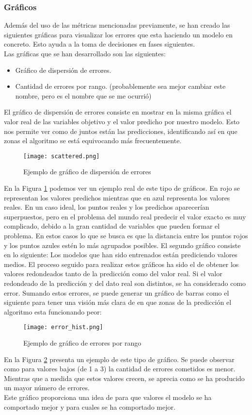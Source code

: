 \subsubsection*{Gráficos}
Además del uso de las métricas mencionadas previamente, se han creado las siguientes gráficas para visualizar los errores que esta haciendo un modelo en concreto. Esto ayuda a la toma de decisiones en fases siguientes.\\
Las gráficas que se han desarrollado son las siguientes:
\begin{itemize}
	\item Gráfico de dispersión de errores.
	\item Cantidad de errores por rango. (probablemente sea mejor cambiar este nombre, pero es el nombre que se me ocurrió)
\end{itemize}
El gráfico de dispersión de errores consiste en mostrar en la misma gráfica el valor real de las variables objetivo y el valor predicho por nuestro modelo. Esto nos permite ver como de juntos están las predicciones, identificando así en que zonas el algoritmo se está equivocando más frecuentemente.\\
\begin{figure}[H]
	\centering
	\texttt{[image: scattered.png]}
	\caption{Ejemplo de gráfico de dispersión de errores}
	\label{fig:scattered_example}
\end{figure}
En la Figura \ref{fig:scattered_example} podemos ver un ejemplo real de este tipo de gráficos. En rojo se representan los valores predichos mientras que en azul representa los valores reales. En un caso ideal, los puntos reales y los predichos aparecerían superpuestos, pero en el problema del mundo real predecir el valor exacto es muy complicado, debido a la gran cantidad de variables que pueden formar el problema. En estos casos lo que se busca es que la distancia entre los puntos rojos y los puntos azules estén lo más agrupados posibles.
\pagebreak
El segundo gráfico consiste en lo siguiente:
Los modelos que han sido entrenados están prediciendo valores medios. El proceso seguido para realizar estos gráficos ha sido el de obtener los valores redondeados tanto de la predicción como del valor real. Si el valor redondeado de la predicción y del dato real son distintos, se ha considerado como error. Sumando estos errores, se puede generar un gráfico de barras como el siguiente para tener una visión más clara de en que zonas de la predicción el algoritmo esta funcionando peor:
\linebreak
\begin{figure}[H]
	\centering
	\texttt{[image: error\_hist.png]}
	\caption{Ejemplo de gráfico de errores por rango}
	\label{fig:error_hist_example}
\end{figure}
En la Figura \ref{fig:error_hist_example} presenta un ejemplo de este tipo de gráfico. Se puede observar como para valores bajos (de 1 a 3) la cantidad de errores cometidos es menor. Mientras que a medida que estos valores crecen, se aprecia como se ha producido un mayor número de errores.\\
Este gráfico proporciona una idea de para que valores el modelo se ha comportado mejor y para cuales se ha comportado mejor.
